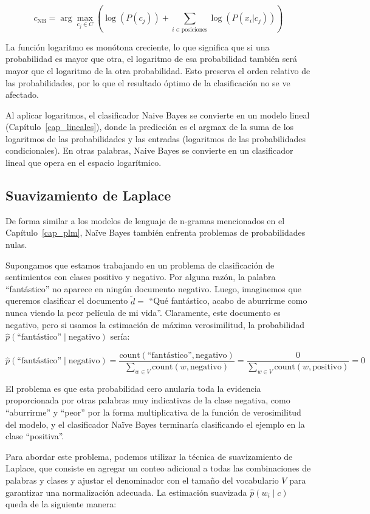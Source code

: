 \documentclass[11pt,fleqn]{book} %
\begin{document}
\[
c_{\text{NB}} = \arg\max_{c_j \in C} \left(\log(P(c_j)) + \sum_{i \in \text{posiciones}} \log(P(x_i | c_j))\right)
\]

La función logaritmo es monótona creciente, lo que significa que si una probabilidad es mayor que otra, el logaritmo de esa probabilidad también será mayor que el logaritmo de la otra probabilidad. Esto preserva el orden relativo de las probabilidades, por lo que el resultado óptimo de la clasificación no se ve afectado.

Al aplicar logaritmos, el clasificador Naive Bayes se convierte en un modelo lineal (Capítulo~\ref{cap_lineales}), donde la predicción es el argmax de la suma de los logaritmos de las probabilidades y las entradas (logaritmos de las probabilidades condicionales). En otras palabras, Naive Bayes se convierte en un clasificador lineal que opera en el espacio logarítmico.

\subsection{Suavizamiento de Laplace}

De forma similar a los modelos de lenguaje de n-gramas mencionados en el Capítulo~\ref{cap_plm}, Naïve Bayes también enfrenta problemas de probabilidades nulas.

Supongamos que estamos trabajando en un problema de clasificación de sentimientos con clases positivo y negativo. Por alguna razón, la palabra ``fantástico'' no aparece en ningún documento negativo. Luego, imaginemos que queremos clasificar el documento $\tilde{d}=$ ``Qué fantástico, acabo de aburrirme como nunca viendo la peor película de mi vida''. Claramente, este documento es negativo, pero si usamos la estimación de máxima verosimilitud, la probabilidad $\hat{p}(\text{``fantástico''} \mid \text{negativo})$ sería:

\[
\hat{p}(\text{``fantástico''} \mid \text{negativo}) = \frac{\text{count}(\text{``fantástico''}, \text{negativo})}{\sum_{w \in V} \text{count}(w, \text{negativo})} = \frac{0}{\sum_{w \in V} \text{count}(w, \text{positivo})} = 0
\]

El problema es que esta probabilidad cero anularía toda la evidencia proporcionada por otras palabras muy indicativas de la clase negativa, como ``aburrirme'' y ``peor'' por la forma multiplicativa de la función de verosimilitud del modelo, y el clasificador Naïve Bayes terminaría clasificando el ejemplo en la clase ``positiva''.

Para abordar este problema, podemos utilizar la técnica de suavizamiento de Laplace, que consiste en agregar un conteo adicional a todas las combinaciones de palabras y clases y ajustar el denominador con el tamaño del vocabulario $V$ para garantizar una normalización adecuada. La estimación suavizada $\hat{p}(w_i \mid c)$ queda de la siguiente manera:
\end{document}
